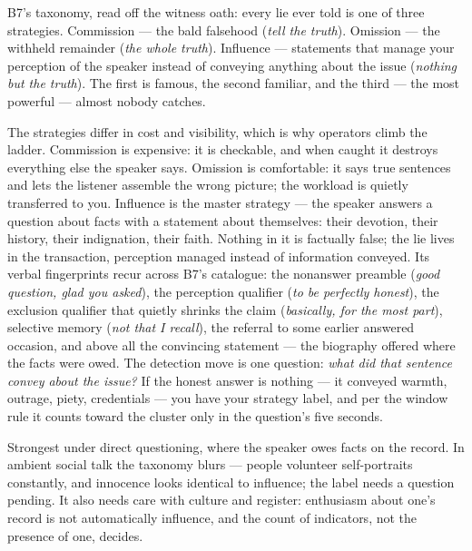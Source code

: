 \begin{core}
B7's taxonomy, read off the witness oath: every lie ever told is one of three strategies. Commission --- the bald falsehood (\emph{tell the truth}). Omission --- the withheld remainder (\emph{the whole truth}). Influence --- statements that manage your perception of the speaker instead of conveying anything about the issue (\emph{nothing but the truth}). The first is famous, the second familiar, and the third --- the most powerful --- almost nobody catches.
\end{core}
\begin{mechanism}
The strategies differ in cost and visibility, which is why operators climb the ladder. Commission is expensive: it is checkable, and when caught it destroys everything else the speaker says. Omission is comfortable: it says true sentences and lets the listener assemble the wrong picture; the workload is quietly transferred to you. Influence is the master strategy --- the speaker answers a question about facts with a statement about themselves: their devotion, their history, their indignation, their faith. Nothing in it is factually false; the lie lives in the transaction, perception managed instead of information conveyed. Its verbal fingerprints recur across B7's catalogue: the nonanswer preamble (\emph{good question, glad you asked}), the perception qualifier (\emph{to be perfectly honest}), the exclusion qualifier that quietly shrinks the claim (\emph{basically, for the most part}), selective memory (\emph{not that I recall}), the referral to some earlier answered occasion, and above all the convincing statement --- the biography offered where the facts were owed. The detection move is one question: \emph{what did that sentence convey about the issue?} If the honest answer is nothing --- it conveyed warmth, outrage, piety, credentials --- you have your strategy label, and per the window rule it counts toward the cluster only in the question's five seconds.
\end{mechanism}
\begin{conditions}
Strongest under direct questioning, where the speaker owes facts on the record. In ambient social talk the taxonomy blurs --- people volunteer self-portraits constantly, and innocence looks identical to influence; the label needs a question pending. It also needs care with culture and register: enthusiasm about one's record is not automatically influence, and the count of indicators, not the presence of one, decides.
\end{conditions}
